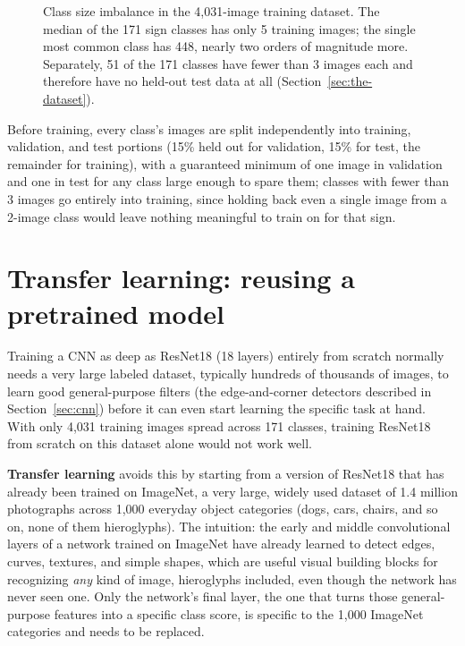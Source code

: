 \documentclass[11pt,a4paper]{report}
\begin{document}
\begin{figure}[t]
\centering
{}
\caption{Class size imbalance in the 4{,}031-image training dataset. The
median of the 171 sign classes has only 5 training images; the single most
common class has 448, nearly two orders of magnitude more. Separately, 51 of
the 171 classes have fewer than 3 images each and therefore have no
held-out test data at all (Section~\ref{sec:the-dataset}).}
\label{fig:class-imbalance}
\end{figure}

Before training, every class's images are split independently into
training, validation, and test portions (15\% held out for validation, 15\%
for test, the remainder for training), with a guaranteed minimum of one
image in validation and one in test for any class large enough to spare
them; classes with fewer than 3 images go entirely into training, since
holding back even a single image from a 2-image class would leave nothing
meaningful to train on for that sign.

\section{Transfer learning: reusing a pretrained model}
\label{sec:transfer-learning}

Training a CNN as deep as ResNet18 (18 layers) entirely from scratch
normally needs a very large labeled dataset, typically hundreds of
thousands of images, to learn good general-purpose filters (the
edge-and-corner detectors described in Section~\ref{sec:cnn}) before it can
even start learning the specific task at hand. With only 4{,}031 training
images spread across 171 classes, training ResNet18 from scratch on this
dataset alone would not work well.

\textbf{Transfer learning} avoids this by starting from a version of
ResNet18 that has already been trained on ImageNet, a very large, widely
used dataset of 1.4 million photographs across 1{,}000 everyday object
categories (dogs, cars, chairs, and so on, none of them hieroglyphs). The
intuition: the early and middle convolutional layers of a network trained on
ImageNet have already learned to detect edges, curves, textures, and simple
shapes, which are useful visual building blocks for recognizing
\emph{any} kind of image, hieroglyphs included, even though the network has
never seen one. Only the network's final layer, the one that turns those
general-purpose features into a specific class score, is specific to the
1{,}000 ImageNet categories and needs to be replaced.
\end{document}
